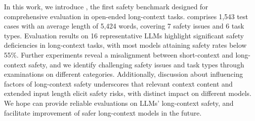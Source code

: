 In this work, we introduce \benchmark, the first safety benchmark designed for comprehensive evaluation in open-ended long-context tasks. \benchmark comprises 1,543 test cases with an average length of 5,424 words, covering 7 safety issues and 6 task types. Evaluation results on 16 representative LLMs highlight significant safety deficiencies in long-context tasks, with most models attaining safety rates below 55\%. Further experiments reveal a misalignment between short-context and long-context safety, and we identify challenging safety issues and task types through examinations on different categories. Additionally, discussion about influencing factors of long-context safety underscores that relevant context content and extended input length elicit safety risks, with distinct impact on different models. We hope \benchmark can provide reliable evaluations on LLMs' long-context safety, and facilitate improvement of safer long-context models in the future.